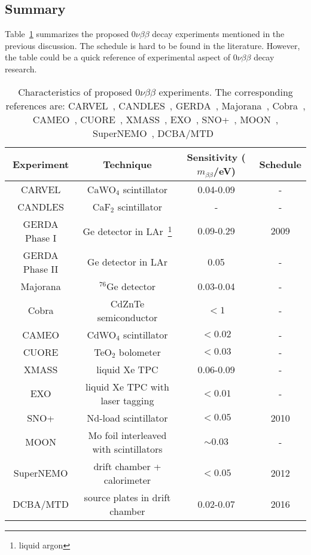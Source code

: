 \subsection{Summary}
\label{sec:exp:comp}
Table~\ref{tab:gerda:comp} summarizes the proposed $0\nu\beta\beta$ decay experiments mentioned in the previous discussion. The schedule is hard to be found in the literature. However, the table could be a quick reference of experimental aspect of $0\nu\beta\beta$ decay research.

\begin{table}[htbp]
  \centering
  \caption{Characteristics of proposed $0\nu\beta\beta$ experiments.                         The corresponding references are: CARVEL~\cite{Zde05},     CANDLES~\cite{Hir08}, GERDA~\cite{Sch05,Cal06}, Majorana~\cite{Aal04},     Cobra~\cite{Kie03}, CAMEO~\cite{Bel01}, CUORE~\cite{Ard05},     XMASS~\cite{Nak02}, EXO~\cite{Dan00}, SNO+~\cite{Zub07},             MOON~\cite{Nak06}, SuperNEMO~\cite{Sne08}, DCBA/MTD~\cite{Ish07}}
  \label{tab:gerda:comp}
  \begin{minipage}{\linewidth}
    \begin{tabular}{cccc} \hline Experiment & Technique & Sensitivity       ($m_{\beta\beta}$/eV) & Schedule \\\hline
      CARVEL & CaWO$_{4}$  scintillator & 0.04-0.09 & - \\
      CANDLES & CaF$_{2}$ scintillator & - & - \\
      GERDA Phase I & Ge detector in LAr~\footnote{liquid argon} &       0.09-0.29 & 2009 \\
      GERDA Phase II & Ge detector in LAr & 0.05 & - \\
      Majorana & $^{76}$Ge detector & 0.03-0.04 & - \\
      Cobra & CdZnTe semiconductor & $< 1$ & - \\
      CAMEO & CdWO$_{4}$ scintillator & $< 0.02$ & - \\
      CUORE & TeO$_{2}$ bolometer & $< 0.03$ & - \\
      XMASS & liquid Xe TPC & 0.06-0.09 & - \\
      EXO & liquid Xe TPC with laser tagging & $< 0.01$ & - \\
      SNO+ & Nd-load scintillator & $< 0.05$ & 2010 \\ 
      MOON & Mo foil interleaved with scintillators & $\sim0.03$ & -\\
      SuperNEMO & drift chamber + calorimeter & $< 0.05$ & 2012 \\
      DCBA/MTD & source plates in drift chamber & 0.02-0.07 & 2016 \\
    \end{tabular}
  \end{minipage}
\end{table}

